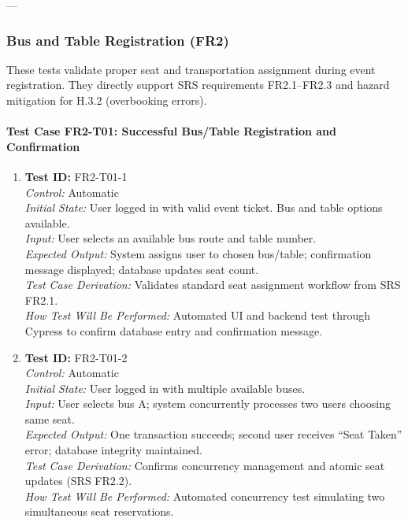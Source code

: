 \documentclass[12pt, titlepage]{article}
\begin{document}
---

\subsubsection{Bus and Table Registration (FR2)}

These tests validate proper seat and transportation assignment during event registration. They directly support SRS requirements FR2.1–FR2.3 and hazard mitigation for H.3.2 (overbooking errors).

\paragraph{Test Case FR2-T01: Successful Bus/Table Registration and Confirmation}

\begin{enumerate}\setlength{\itemsep}{1em}
    \item \textbf{Test ID:} FR2-T01-1\\[0.5em]
    \textit{Control:} Automatic\\[0.3em]
    \textit{Initial State:} User logged in with valid event ticket. Bus and table options available.\\[0.3em]
    \textit{Input:} User selects an available bus route and table number.\\[0.3em]
    \textit{Expected Output:} System assigns user to chosen bus/table; confirmation message displayed; database updates seat count.\\[0.3em]
    \textit{Test Case Derivation:} Validates standard seat assignment workflow from SRS FR2.1.\\[0.3em]
    \textit{How Test Will Be Performed:} Automated UI and backend test through Cypress to confirm database entry and confirmation message.

    \item \textbf{Test ID:} FR2-T01-2\\[0.5em]
    \textit{Control:} Automatic\\[0.3em]
    \textit{Initial State:} User logged in with multiple available buses.\\[0.3em]
    \textit{Input:} User selects bus A; system concurrently processes two users choosing same seat.\\[0.3em]
    \textit{Expected Output:} One transaction succeeds; second user receives “Seat Taken” error; database integrity maintained.\\[0.3em]
    \textit{Test Case Derivation:} Confirms concurrency management and atomic seat updates (SRS FR2.2).\\[0.3em]
    \textit{How Test Will Be Performed:} Automated concurrency test simulating two simultaneous seat reservations.


\end{enumerate}
\end{document}

